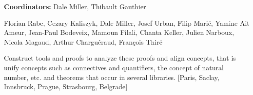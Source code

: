 {\bf Coordinators:} Dale Miller, Thibault Gauthier

Florian Rabe, Cezary Kaliszyk, Dale Miller, Josef Urban,
Filip Marić, Yamine Ait Ameur, Jean-Paul Bodeveix, Mamoun Filali,
Chanta Keller, Julien Narboux, Nicola Magaud, Arthur Charguéraud,
François Thiré

Construct tools and proofs to analyze these proofs and align concepts,
that is unify concepts such as connectives and quantifiers, the
concept of natural number, etc. and theorems that occur in several
libraries.  [Paris, Saclay, Innsbruck, Prague, Strasbourg, Belgrade]

